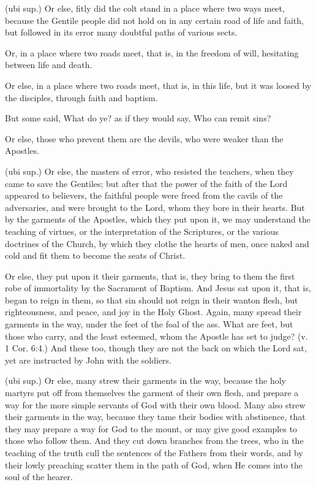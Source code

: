  (ubi sup.) Or else, fitly did the colt stand in a place where two ways meet, because the Gentile people did not hold on in any certain road of life and faith, but followed in its error many doubtful paths of various sects.

 Or, in a place where two roads meet, that is, in the freedom of will, hesitating between life and death.

 Or else, in a place where two roads meet, that is, in this life, but it was loosed by the disciples, through faith and baptism.

 But some said, What do ye? as if they would say, Who can remit sins?

 Or else, those who prevent them are the devils, who were weaker than the Apostles.

 (ubi sup.) Or else, the masters of error, who resisted the teachers, when they came to save the Gentiles; but after that the power of the faith of the Lord appeared to believers, the faithful people were freed from the cavils of the adversaries, and were brought to the Lord, whom they bore in their hearts. But by the garments of the Apostles, which they put upon it, we may understand the teaching of virtues, or the interpretation of the Scriptures, or the various doctrines of the Church, by which they clothe the hearts of men, once naked and cold and fit them to become the seats of Christ.

 Or else, they put upon it their garments, that is, they bring to them the first robe of immortality by the Sacrament of Baptism. And Jesus sat upon it, that is, began to reign in them, so that sin should not reign in their wanton flesh, but righteousness, and peace, and joy in the Holy Ghost. Again, many spread their garments in the way, under the feet of the foal of the ass. What are feet, but those who carry, and the least esteemed, whom the Apostle has set to judge? (v. 1 Cor. 6:4.) And these too, though they are not the back on which the Lord sat, yet are instructed by John with the soldiers.

 (ubi sup.) Or else, many strew their garments in the way, because the holy martyrs put off from themselves the garment of their own flesh, and prepare a way for the more simple servants of God with their own blood. Many also strew their garments in the way, because they tame their bodies with abstinence, that they may prepare a way for God to the mount, or may give good examples to those who follow them. And they cut down branches from the trees, who in the teaching of the truth cull the sentences of the Fathers from their words, and by their lowly preaching scatter them in the path of God, when He comes into the soul of the hearer.

